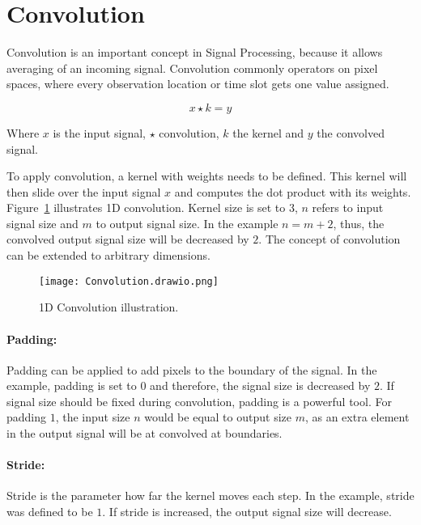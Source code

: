 \section{Convolution}
Convolution is an important concept in Signal Processing, because it allows averaging of an incoming signal.
Convolution commonly operators on pixel spaces, where every observation location or time slot gets one value assigned.

\begin{equation}
  x \star k = y
\end{equation}

Where $x$ is the input signal, $\star$ convolution, $k$ the kernel and $y$ the convolved signal.

To apply convolution, a kernel with weights needs to be defined. 
This kernel will then slide over the input signal $x$ and computes the dot product with its weights.
Figure~\ref{fig:1d-convolution} illustrates 1D convolution. Kernel size is set to 3, $n$ refers to input signal size and $m$ to output signal size.
In the example  $ n = m + 2$, thus, the convolved output signal size will be decreased by $2$.
The concept of convolution can be extended to arbitrary dimensions.

\begin{figure}[H]
  \centering
  \texttt{[image: Convolution.drawio.png]}
  \caption{1D Convolution illustration.}
  \label{fig:1d-convolution}
\end{figure}

\paragraph{Padding:} 


Padding can be applied to add pixels to the boundary of the signal.
In the example, padding is set to $0$ and therefore, the signal size is decreased by $2$.
If signal size should be fixed during convolution, padding is a powerful tool. For padding $1$,
the input size $n$ would be equal to output size $m$, as an extra element in the output signal
will be at convolved at boundaries.


\paragraph{Stride:}
Stride is the parameter how far the kernel moves each step. In the example, stride was defined to be $1$.
If stride is increased, the output signal size will decrease.

